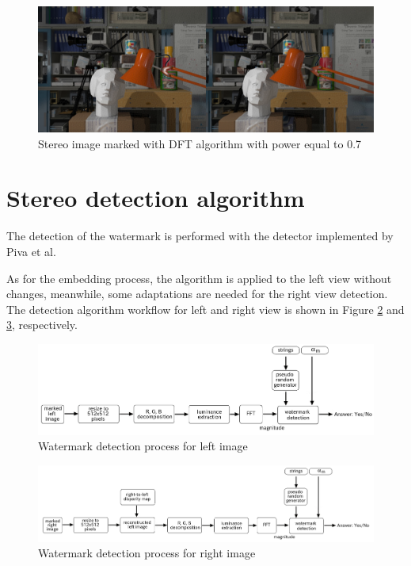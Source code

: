 \begin{figure}[h!]
\centering
\includegraphics[width=1\textwidth]{./img/marked_07_DFT.png}
\caption{\small{Stereo image marked with DFT algorithm with power equal to 0.7}}
\label{fig:dft07}
\end{figure}

\section{Stereo detection algorithm}

The detection of the watermark is performed with the detector implemented by Piva et al.\newline

As for the embedding process, the algorithm is applied to the left view without changes, meanwhile, some adaptations are needed for the right view detection. The detection algorithm workflow for left and right view is shown in Figure \ref{fig:left_dec} and \ref{fig:right_dec}, respectively. \newline

\begin{figure}[h!]
\centering
\includegraphics[width=1\textwidth]{./img/left_det.png}
\caption{\small{Watermark detection process for left image}\label{fig:left_dec}}

\end{figure}

\begin{figure}[h!]
\centering
\includegraphics[width=1\textwidth]{./img/right_det.png}
\caption{\small{Watermark detection process for right image}\label{fig:right_dec}}

\end{figure}



